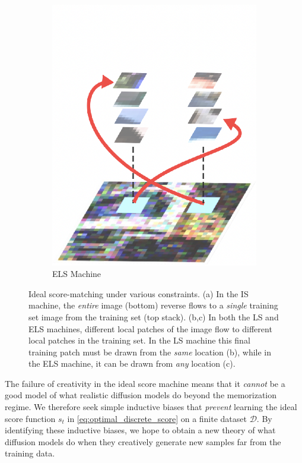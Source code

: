\documentclass{article}
\theoremstyle{plain}
\theoremstyle{definition}
\theoremstyle{remark}
\begin{document}
\begin{figure}[t]
\begin{subfigure}[t]{0.2875\linewidth}
\includegraphics[width=\linewidth]{ELS1.png}
\caption{ELS Machine}
\label{fig:els-machine-structurec}
\end{subfigure} 


    
    \caption{Ideal score-matching under various constraints. (a) In the IS machine, the {\it entire} image (bottom) reverse flows to a {\it single} training set image from the training set (top stack). (b,c) In both the LS and ELS machines, different local patches of the image flow to different local patches in the training set. In the LS machine this final training patch must be drawn from the {\it same} location (b), while in the ELS machine, it can be drawn from {\it any} location (c).}
    \label{fig:els-machine-structure}
\end{figure}

The failure of creativity in the ideal score machine means that it {\it cannot} be a good model of what realistic diffusion models do beyond the memorization regime. We therefore seek simple inductive biases that {\it prevent} learning the ideal score function $s_t$ in \eqref{eq:optimal_discrete_score} on a finite dataset $\mathcal D$. By identifying these inductive biases, we hope to obtain a new theory of what diffusion models do when they creatively generate new samples far from the training data. 
\end{document}
